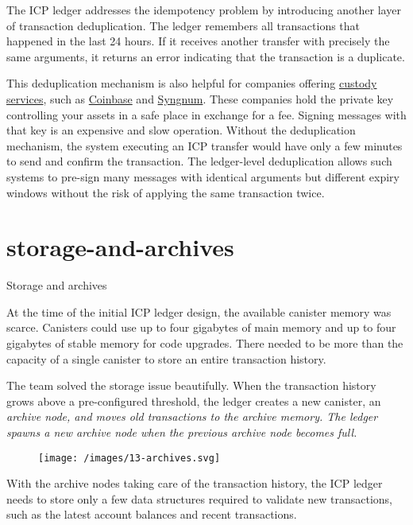 \documentclass{article}
\begin{document}
The ICP ledger addresses the idempotency problem by introducing another layer of transaction deduplication.
The ledger remembers all transactions that happened in the last 24 hours.
If it receives another transfer with precisely the same arguments, it returns an error indicating that the transaction is a duplicate.

This deduplication mechanism is also helpful for companies offering \href{https://www.coindesk.com/learn/what-is-crypto-custody/}{custody services}, such as \href{https://www.coinbase.com}{Coinbase} and \href{https://www.sygnum.com}{Syngnum}.
These companies hold the private key controlling your assets in a safe place in exchange for a fee.
Signing messages with that key is an expensive and slow operation.
Without the deduplication mechanism, the system executing an ICP transfer would have only a few minutes to send and confirm the transaction.
The ledger-level deduplication allows such systems to pre-sign many messages with identical arguments but different expiry windows without the risk of applying the same transaction twice.

\section{storage-and-archives}{Storage and archives}

At the time of the initial ICP ledger design, the available canister memory was scarce.
Canisters could use up to four gigabytes of main memory and up to four gigabytes of stable memory for code upgrades.
There needed to be more than the capacity of a single canister to store an entire transaction history.

The team solved the storage issue beautifully.
When the transaction history grows above a pre-configured threshold, the ledger creates a new canister, an \em{archive node}, and moves old transactions to the archive memory.
The ledger spawns a new archive node when the previous archive node becomes full.

\begin{figure}[grayscale-diagram]
  \texttt{[image: /images/13-archives.svg]}
\end{figure}

With the archive nodes taking care of the transaction history, the ICP ledger needs to store only a few data structures required to validate new transactions, such as the latest account balances and recent transactions.
\end{document}
